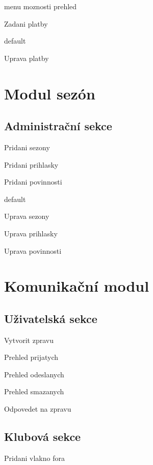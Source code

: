 \documentclass[11pt,oneside]{fithesis}
\begin{document}
            menu
            moznosti
            prehled

            Zadani platby

            default

            Uprava platby



        \section{Modul sezón}



            \subsection*{Administrační sekce}



            Pridani sezony

            Pridani prihlasky

            Pridani povinnosti

            default

            Uprava sezony

            Uprava prihlasky

            Uprava povinnosti



        \section{Komunikační modul}



            \subsection*{Uživatelská sekce}

            Vytvorit zpravu

            Prehled prijatych

            Prehled odeslanych

            Prehled smazanych

            Odpovedet na zpravu



            \subsection*{Klubová sekce}

            Pridani vlakno fora
\end{document}
